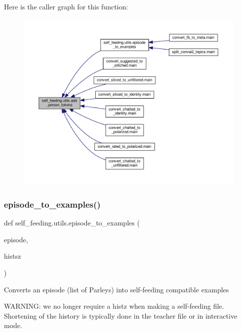 Here is the caller graph for this function\+:
\nopagebreak
\begin{figure}[H]
\begin{center}
\leavevmode
\includegraphics[width=350pt]{namespaceself__feeding_1_1utils_ab55b6655be64ff265dbccaf4b59ccdfe_icgraph}
\end{center}
\end{figure}
\mbox{\label{namespaceself__feeding_1_1utils_a40d25d283be41f59e7167424691b4ba8}} 
\subsubsection{\texorpdfstring{episode\+\_\+to\+\_\+examples()}{episode\_to\_examples()}}
{\footnotesize\ttfamily def self\+\_\+feeding.\+utils.\+episode\+\_\+to\+\_\+examples (\begin{DoxyParamCaption}\item[{}]{episode,  }\item[{}]{histsz }\end{DoxyParamCaption})}

\begin{DoxyVerb}Converts an episode (list of Parleys) into self-feeding compatible examples

WARNING: we no longer require a histz when making a self-feeding file. Shortening of
the history is typically done in the teacher file or in interactive mode.
\end{DoxyVerb}
 


